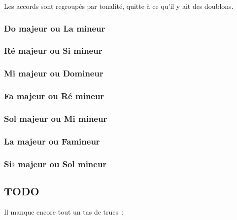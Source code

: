 \documentclass[11pt]{article}
\begin{document}
Les accords sont regroupés par tonalité, quitte à ce qu’il y ait des doublons.

\subsubsection{Do majeur ou La mineur}


\subsubsection{Ré majeur ou Si mineur}


\subsubsection{Mi majeur ou Do\shrp mineur}


\subsubsection{Fa majeur ou Ré mineur}


\subsubsection{Sol majeur ou Mi mineur}


\subsubsection{La majeur ou Fa\shrp mineur}


\subsubsection{Si$\flat$ majeur ou Sol mineur}


\subsection{TODO}


Il manque encore tout un tas de trucs~:
\end{document}
